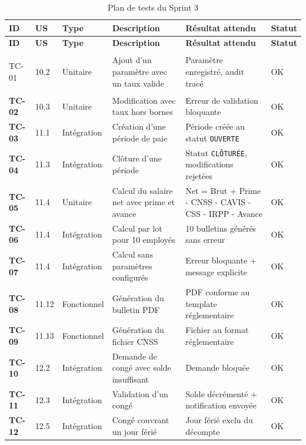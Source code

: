 \begin{small}
\renewcommand{\arraystretch}{1.3}
\begin{longtable}{|>{\bfseries}p{1.5cm}|p{1.2cm}|p{2cm}|p{4.5cm}|p{2.5cm}|p{1.5cm}|}

\hline
\rowcolor[gray]{0.9}\textbf{ID} & \textbf{US} & \textbf{Type} &
\textbf{Description} & \textbf{Résultat attendu} & \textbf{Statut} \\ \hline
\endfirsthead
\hline
\rowcolor[gray]{0.9}\textbf{ID} & \textbf{US} & \textbf{Type} &
\textbf{Description} & \textbf{Résultat attendu} & \textbf{Statut} \\ \hline
\endhead
\hline
\endfoot
\hline
\caption{Plan de tests du Sprint 3 }
\label{tab:tests-sprint3} 
\endlastfoot
TC-01 & 10.2 & Unitaire & Ajout d'un paramètre avec un taux valide & Paramètre enregistré, audit tracé & OK \\ \hline
TC-02 & 10.3 & Unitaire & Modification avec taux hors bornes & Erreur de validation bloquante & OK \\ \hline
TC-03 & 11.1 & Intégration & Création d'une période de paie & Période créée au statut \texttt{OUVERTE} & OK \\ \hline
TC-04 & 11.3 & Intégration & Clôture d'une période & Statut \texttt{CLÔTURÉE}, modifications rejetées & OK \\ \hline
TC-05 & 11.4 & Unitaire & Calcul du salaire net avec prime et avance & Net = Brut + Prime - CNSS - CAVIS - CSS - IRPP - Avance & OK \\ \hline
TC-06 & 11.4 & Intégration & Calcul par lot pour 10 employés & 10 bulletins générés sans erreur & OK \\ \hline
TC-07 & 11.4 & Intégration & Calcul sans paramètres configurés & Erreur bloquante + message explicite & OK \\ \hline
TC-08 & 11.12 & Fonctionnel & Génération du bulletin PDF & PDF conforme au template réglementaire & OK \\ \hline
TC-09 & 11.13 & Fonctionnel & Génération du fichier CNSS & Fichier au format réglementaire & OK \\ \hline
TC-10 & 12.2 & Intégration & Demande de congé avec solde insuffisant & Demande bloquée & OK \\ \hline
TC-11 & 12.3 & Intégration & Validation d'un congé & Solde décrémenté + notification envoyée & OK \\ \hline
TC-12 & 12.5 & Intégration & Congé couvrant un jour férié & Jour férié exclu du décompte & OK \\ \hline
\end{longtable}
\end{small}
\renewcommand{\arraystretch}{1.0}

